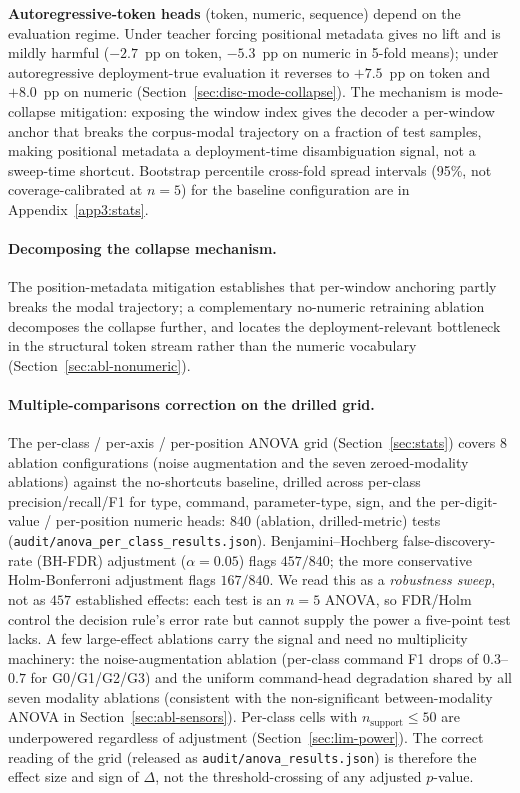 \documentclass[sensors,article,submit,moreauthors,pdftex]{Definitions/mdpi}
\begin{document}
\textbf{Autoregressive-token heads} (token, numeric, sequence) depend on the evaluation regime. Under teacher forcing positional metadata gives no lift and is mildly harmful ($-2.7$~pp on token, $-5.3$~pp on numeric in 5-fold means); under autoregressive deployment-true evaluation it reverses to $+7.5$~pp on token and $+8.0$~pp on numeric (Section~\ref{sec:disc-mode-collapse}). The mechanism is mode-collapse mitigation: exposing the window index gives the decoder a per-window anchor that breaks the corpus-modal trajectory on a fraction of test samples, making positional metadata a deployment-time disambiguation signal, not a sweep-time shortcut. Bootstrap percentile cross-fold spread intervals (95\%, not coverage-calibrated at $n\!=\!5$) for the baseline configuration are in Appendix~\ref{app3:stats}.

\paragraph{Decomposing the collapse mechanism.} The position-metadata mitigation establishes that per-window anchoring partly breaks the modal trajectory; a complementary no-numeric retraining ablation decomposes the collapse further, and locates the deployment-relevant bottleneck in the structural token stream rather than the numeric vocabulary (Section~\ref{sec:abl-nonumeric}).

\paragraph{Multiple-comparisons correction on the drilled grid.} The per-class / per-axis / per-position ANOVA grid (Section~\ref{sec:stats}) covers 8 ablation configurations (noise augmentation and the seven zeroed-modality ablations) against the no-shortcuts baseline, drilled across per-class precision/recall/F1 for type, command, parameter-type, sign, and the per-digit-value / per-position numeric heads: $840$ (ablation, drilled-metric) tests (\texttt{audit/anova\_per\_class\_results.json}). Benjamini--Hochberg false-discovery-rate (BH-FDR) adjustment ($\alpha=0.05$) flags $457 / 840$; the more conservative Holm-Bonferroni adjustment flags $167 / 840$. We read this as a \emph{robustness sweep}, not as $457$ established effects: each test is an $n\!=\!5$ ANOVA, so FDR/Holm control the decision rule's error rate but cannot supply the power a five-point test lacks. A few large-effect ablations carry the signal and need no multiplicity machinery: the noise-augmentation ablation (per-class command F1 drops of $0.3$--$0.7$ for G0/G1/G2/G3) and the uniform command-head degradation shared by all seven modality ablations (consistent with the non-significant between-modality ANOVA in Section~\ref{sec:abl-sensors}). Per-class cells with $n_{\text{support}}\le 50$ are underpowered regardless of adjustment (Section~\ref{sec:lim-power}). The correct reading of the grid (released as \texttt{audit/anova\_results.json}) is therefore the effect size and sign of $\Delta$, not the threshold-crossing of any adjusted $p$-value.
\end{document}
